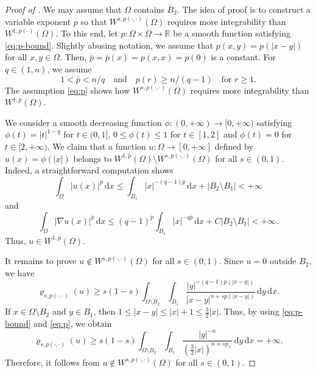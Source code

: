 \documentclass[11pt]{amsart}
\theoremstyle{plain}
\theoremstyle{definition}
\numberwithin{equation}{section}
\begin{document}
\begin{proof} [Proof of ]
We may assume that $\Omega$ contains $\overline{B}_{2}$. The idea of proof is to construct a variable exponent $p$ so that $W^{s, p(\cdot, \cdot)}(\Omega)$ requires more integrability than $W^{1, \bar{p}(\cdot)}(\Omega)$. To this end, let $p: \Omega \times \Omega \to \mathbb{R}$ be a smooth function satisfying \eqref{eq:p-bound}. Slightly abusing notation, we assume that $p(x, y) = p(|x-y|)$ for all $x, y \in \Omega$. Then, $\bar{p} = \bar{p}(x) = p(x, x) = p(0)$ is a constant. For $q \in (1, n)$, we assume
\begin{equation} \label{eq:p}
1 < \bar{p} < n/q \quad\text{and}\quad p(r) \geq n/(q-1) \quad\text{for } r \geq 1.
\end{equation}
The assumption \eqref{eq:p} shows how $W^{s, p(\cdot, \cdot)}(\Omega)$ requires more integrability than $W^{1, \bar{p}}(\Omega)$.

We consider a smooth decreasing function $\phi: (0, +\infty) \to [0, +\infty)$ satisfying $\phi(t) = |t|^{1-q}$ for $t \in (0, 1]$, $0 \leq \phi(t) \leq 1$ for $t \in [1, 2]$ and $\phi(t) = 0$ for $t \in [2, +\infty)$. We claim that a function $u: \Omega \to [0, +\infty]$ defined by $u(x) = \phi(|x|)$ belongs to $W^{1, \bar{p}}(\Omega) \setminus W^{s, p(\cdot, \cdot)}(\Omega)$ for all $s \in (0,1)$. Indeed, a straightforward computation shows
\begin{equation*}
\int_{\Omega} |u(x)|^{\bar{p}} \,\mathrm{d}x \leq \int_{B_{1}} |x|^{-(q-1)\bar{p}} \,\mathrm{d}x + |B_{2} \setminus B_{1}| < +\infty
\end{equation*}
and
\begin{equation*}
\int_{\Omega} |\nabla u(x)|^{\bar{p}} \,\mathrm{d}x \leq (q-1)^{\bar{p}} \int_{B_{1}} |x|^{-q\bar{p}} \,\mathrm{d}x + C |B_{2} \setminus B_{1}| < + \infty.
\end{equation*}
Thus, $u \in W^{1, \bar{p}}(\Omega)$.

It remains to prove $u \not\in W^{s, p(\cdot, \cdot)}(\Omega)$ for all $s \in (0,1)$. Since $u=0$ outside $B_{2}$, we have
\begin{equation*}
\varrho_{s, p(\cdot, \cdot)}(u) \geq s(1-s) \int_{\Omega \setminus B_{2}} \int_{B_{1}} \frac{|y|^{-(q-1)p(|x-y|)}}{|x-y|^{n+sp(|x-y|)}} \,\mathrm{d}y \,\mathrm{d}x.
\end{equation*}
If $x \in \Omega \setminus B_{2}$ and $y \in B_{1}$, then $1 \leq |x-y| \leq |x|+1 \leq \frac{3}{2} |x|$. Thus, by using \eqref{eq:p-bound} and \eqref{eq:p}, we obtain
\begin{equation*}
\varrho_{s, p(\cdot, \cdot)}(u) \geq s(1-s) \int_{\Omega \setminus B_{2}} \int_{B_{1}} \frac{|y|^{-n}}{(\frac{3}{2}|x|)^{n+sp_+}} \,\mathrm{d}y \,\mathrm{d}x = +\infty.
\end{equation*}
Therefore, it follows from  $u \notin W^{s, p(\cdot, \cdot)}(\Omega)$ for all $s \in (0,1)$.
\end{proof}
\end{document}
